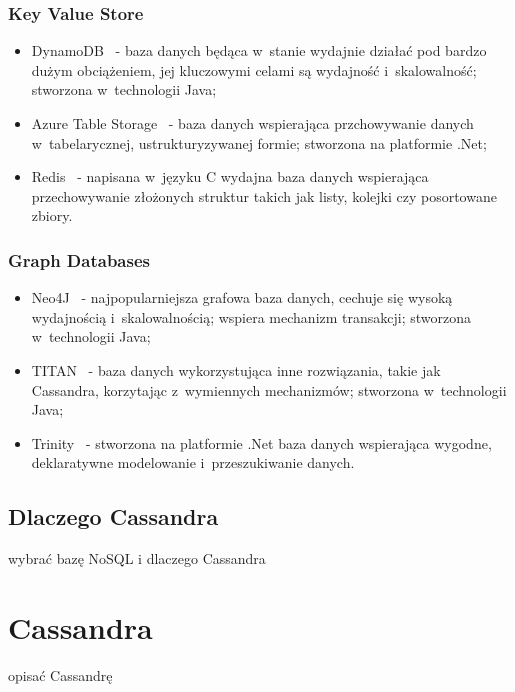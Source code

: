 \subsubsection{Key Value Store}

\begin{itemize}
 \item DynamoDB~\cite{dynamo_db} - baza danych będąca w~stanie wydajnie działać pod bardzo dużym obciążeniem, jej kluczowymi celami są wydajność i~skalowalność; stworzona w~technologii Java;
 \item Azure Table Storage~\cite{azure_table_storage} - baza danych wspierająca przchowywanie danych w~tabelarycznej, ustrukturyzywanej formie; stworzona na platformie .Net;
 \item Redis~\cite{redis} - napisana w~języku C wydajna baza danych wspierająca przechowywanie złożonych struktur takich jak listy, kolejki czy posortowane zbiory.
\end{itemize}

\subsubsection{Graph Databases}

\begin{itemize}
 \item Neo4J~\cite{neo4j} - najpopularniejsza grafowa baza danych, cechuje się wysoką wydajnością i~skalowalnością; wspiera mechanizm transakcji; stworzona w~technologii Java;
 \item TITAN~\cite{titan} - baza danych wykorzystująca inne rozwiązania, takie jak Cassandra, korzytając z~wymiennych mechanizmów; stworzona w~technologii Java;
 \item Trinity~\cite{trinity} - stworzona na platformie .Net baza danych wspierająca wygodne, deklaratywne modelowanie i~przeszukiwanie danych.
\end{itemize}


\subsection{Dlaczego Cassandra}

wybrać bazę NoSQL i dlaczego Cassandra



\section{Cassandra}

opisać Cassandrę
